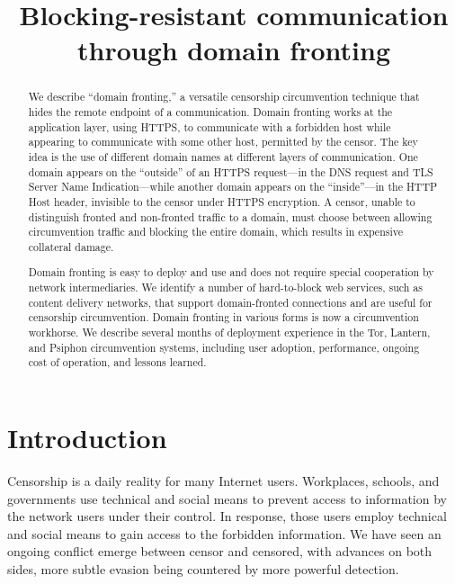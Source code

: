 \documentclass{sig-alternate}
\begin{document}
\title{Blocking-resistant communication\\through domain fronting}

\maketitle

\begin{abstract}
We describe ``domain fronting,'' a versatile censorship circumvention technique
that hides the remote endpoint of a communication.
Domain fronting works at the application layer, using HTTPS,
to communicate with a forbidden host
while appearing to communicate with some other host,
permitted by the censor.
The key idea is the use of different domain names at different layers of communication.
One domain appears on the ``outside'' of an HTTPS request---in the DNS request and
TLS Server Name Indication---while another domain appears
on the ``inside''---in the HTTP Host header, invisible to the
censor under HTTPS encryption.
A censor, unable to distinguish fronted and non-fronted traffic to a domain,
must choose between allowing circumvention traffic
and blocking the entire domain,
which results in expensive collateral damage.

Domain fronting is easy to deploy and use and does not require
special cooperation by network intermediaries.
We identify a number of hard-to-block web services,
such as content delivery networks,
that support domain-fronted connections
and are useful for censorship circumvention.
Domain fronting in various forms is now a circumvention workhorse.
We describe several months of deployment experience
in the Tor, Lantern, and Psiphon circumvention systems,
including user adoption, performance,
ongoing cost of operation, and lessons learned.
\end{abstract}

\section{Introduction}

Censorship is a daily reality for many Internet users.
Workplaces, schools, and governments use technical and social means
to prevent access to information by the network users under their control.
In response, those users employ technical and social means
to gain access to the forbidden information.
We have seen
an ongoing conflict emerge between censor and censored,
with advances on both sides, more subtle evasion being countered by more powerful detection.
\end{document}
